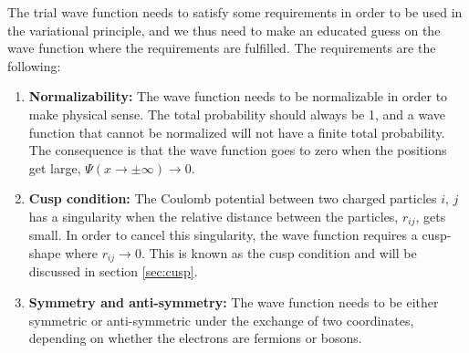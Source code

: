 The trial wave function needs to satisfy some requirements in order to be used in the variational principle, and we thus need to make an educated guess on the wave function where the requirements are fulfilled. The requirements are the following:
\fi

\begin{enumerate}
	\item \textbf{Normalizability:} The wave function needs to be normalizable in order to make physical sense. The total probability should always be 1, and a wave function that cannot be normalized will not have a finite total probability. The consequence is that the wave function goes to zero when the positions get large, $\Psi(x\rightarrow\pm\infty)\rightarrow 0$. 
	
	\item \textbf{Cusp condition:} The Coulomb potential between two charged particles $i$, $j$ has a singularity when the relative distance between the particles, $r_{ij}$, gets small. In order to cancel this singularity, the wave function requires a cusp-shape where $r_{ij}\rightarrow 0$. This is known as the cusp condition and will be discussed in section \ref{sec:cusp}.
	
	\item \textbf{Symmetry and anti-symmetry:} The wave function needs to be either symmetric or anti-symmetric under the exchange of two coordinates, depending on whether the electrons are fermions or bosons.
\end{enumerate}

